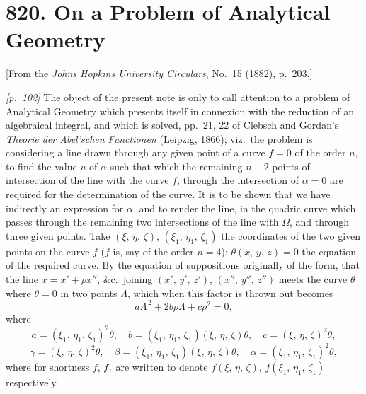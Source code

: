\documentclass[11pt,a4paper]{article}
\theoremstyle{plain}
\theoremstyle{definition}
\theoremstyle{remark}
\begin{document}
\bigskip

\section*{820. On a Problem of Analytical Geometry}

\begin{center}
\small[From the \textit{Johns Hopkins University Circulars}, No.~15 (1882), p.~203.]
\end{center}

\bigskip

\noindent\textit{[p.~102]} The object of the present note is only to call attention to a problem of Analytical Geometry which presents itself in connexion with the reduction of an algebraical integral, and which is solved, pp.~21, 22 of Clebsch and Gordan's \textit{Theorie der Abel'schen Functionen} (Leipzig, 1866); viz.\ the problem is considering a line drawn through any given point of a curve $f=0$ of the order $n$, to find the value $u$ of $\alpha$ such that which the remaining $n - 2$ points of intersection of the line with the curve $f$, through the intersection of $\alpha = 0$ are required for the determination of the curve. It is to be shown that we have indirectly an expression for $\alpha$, and to render the line, in the quadric curve which passes through the remaining two intersections of the line with $\Omega$, and through three given points. Take $(\xi,\,\eta,\,\zeta)$, $(\xi_1,\,\eta_1,\,\zeta_1)$ the coordinates of the two given points on the curve $f$ ($f$ is, say of the order $n = 4$); $\theta(x,\,y,\,z) = 0$ the equation of the required curve. By the equation of suppositions originally of the form, that the line $x = x' + \rho x''$, \&c.\ joining $(x',\,y',\,z')$, $(x'',\,y'',\,z'')$ meets the curve $\theta$ where $\theta = 0$ in two points $\Lambda$, which when this factor is thrown out becomes
\[
a\Lambda^{\,2} + 2b\rho\Lambda + c\rho^2 = 0,
\]
where
\[
a = (\xi_1,\,\eta_1,\,\zeta_1)^2 \theta,\quad b = (\xi_1,\,\eta_1,\,\zeta_1)(\xi,\,\eta,\,\zeta)\theta,\quad c = (\xi,\,\eta,\,\zeta)^2 \theta,
\]
\[
\gamma = (\xi,\,\eta,\,\zeta)^2 \theta,\quad \beta = (\xi_1,\,\eta_1,\,\zeta_1)(\xi,\,\eta,\,\zeta)\theta,\quad \alpha = (\xi_1,\,\eta_1,\,\zeta_1)^2 \theta,
\]
where for shortness $f$, $f_1$ are written to denote $f(\xi,\,\eta,\,\zeta)$, $f(\xi_1,\,\eta_1,\,\zeta_1)$ respectively.
\end{document}

